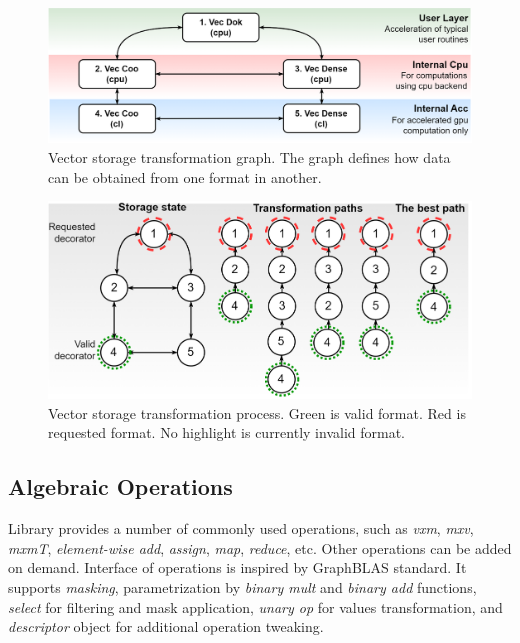 \begin{figure}[]
\centering
\includegraphics[width=1.0\linewidth]{figures/storage_transformation_graph.png}
\caption{Vector storage transformation graph. The graph defines how data can be obtained from one format in another.}
\label{fig:vec_tsf}
\end{figure}

\begin{figure}[]
\centering
\includegraphics[width=1.0\linewidth]{figures/storage_transformation.png}
\caption{Vector storage transformation process. Green is valid format. Red is requested format. No highlight is currently invalid format.}
\label{fig:vec_exmp}
\end{figure}

\subsection{Algebraic Operations}

Library provides a number of commonly used operations, such as \textit{vxm}, \textit{mxv}, \textit{mxmT}, \textit{element-wise add}, \textit{assign}, \textit{map}, \textit{reduce}, etc.
Other operations can be added on demand.
Interface of operations is inspired by GraphBLAS standard. 
It supports \textit{masking}, parametrization by \textit{binary mult} and \textit{binary add} functions, \textit{select} for filtering and mask application, \textit{unary op} for values transformation, and \textit{descriptor} object for additional operation tweaking.

